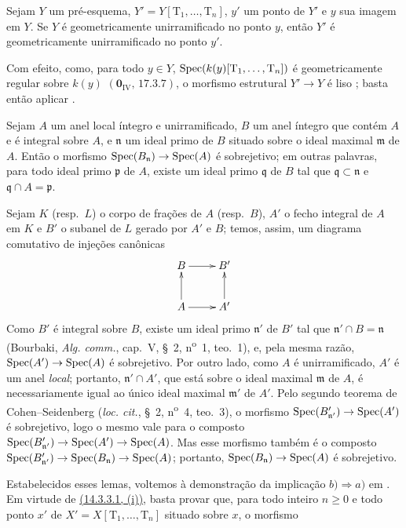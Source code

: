 \begin{lemma}[14.4.1.1]
\label{IV.14.4.1.1}
Sejam $Y$ um pré-esquema, $Y'=Y[\mathrm{T}_1,\ldots,\mathrm{T}_n]$, $y'$ um ponto de $Y'$ e $y$ sua imagem em $Y$.
Se $Y$ é geometricamente unirramificado no ponto $y$, então $Y'$ é geometricamente unirramificado no ponto $y'$.
\end{lemma}

Com efeito, como, para todo $y\in Y$, $\operatorname{Spec}(k(y)[\mathrm{T}_1,\ldots,\mathrm{T}_n])$ é geometricamente regular sobre $k(y)$ $(\mathbf{0}_{\mathrm{IV}},\,17.3.7)$, o morfismo estrutural $Y'\to Y$ é liso ; basta então aplicar .

\begin{lemma}[14.4.1.2]
\label{IV.14.4.1.2}
Sejam $A$ um anel local íntegro e unirramificado, $B$ um anel íntegro que contém $A$ e é integral sobre $A$, e $\mathfrak n$ um ideal primo de $B$ situado sobre o ideal maximal $\mathfrak m$ de $A$.
Então o morfismo $\Spec(B_{\mathfrak n})\to\Spec(A)$ é sobrejetivo; em outras palavras, para todo ideal primo $\mathfrak p$ de $A$, existe um ideal primo $\mathfrak q$ de $B$ tal que $\mathfrak q\subset\mathfrak n$ e $\mathfrak q\cap A=\mathfrak p$.
\end{lemma}

Sejam $K$ (resp.\ $L$) o corpo de frações de $A$ (resp.\ $B$), $A'$ o fecho integral de $A$ em $K$ e $B'$ o subanel de $L$ gerado por $A'$ e $B$; temos, assim, um diagrama comutativo de injeções canônicas
\[
  \xymatrix{
    B \ar[r] & B' \\
    A \ar[u] \ar[r] & A' \ar[u]
  }
\]
Como $B'$ é integral sobre $B$, existe um ideal primo $\mathfrak n'$ de $B'$ tal que $\mathfrak n'\cap B=\mathfrak n$ (Bourbaki, \emph{Alg. comm.}, cap.~V, \S~2, n\textsuperscript{o}~1, teo.~1), e, pela mesma razão, $\Spec(A')\to\Spec(A)$ é sobrejetivo.
Por outro lado, como $A$ é unirramificado, $A'$ é um anel \emph{local}; portanto, $\mathfrak n'\cap A'$, que está sobre o ideal maximal $\mathfrak m$ de $A$, é necessariamente igual ao único ideal maximal $\mathfrak m'$ de $A'$.
Pelo segundo teorema de Cohen--Seidenberg (\emph{loc. cit.}, \S~2, n\textsuperscript{o}~4, teo.~3), o morfismo $\Spec(B'_{\mathfrak n'})\to\Spec(A')$ é sobrejetivo, logo o mesmo vale para o composto $\Spec(B'_{\mathfrak n'})\to\Spec(A')\to\Spec(A)$.
Mas esse morfismo também é o composto $\Spec(B'_{\mathfrak n'})\to\Spec(B_{\mathfrak n})\to\Spec(A)$; portanto, $\Spec(B_{\mathfrak n})\to\Spec(A)$ é sobrejetivo.

Estabelecidos esses lemas, voltemos à demonstração da implicação $b)\Rightarrow a)$ em .
Em virtude de {\hyperlink{ega4.c04.subsec.14-3-3-1}{(14.3.3.1, (i))}}, basta provar que, para todo inteiro $n\geq 0$ e todo ponto $x'$ de $X'=X[\mathrm{T}_1,\ldots,\mathrm{T}_n]$ situado sobre $x$, o morfismo

